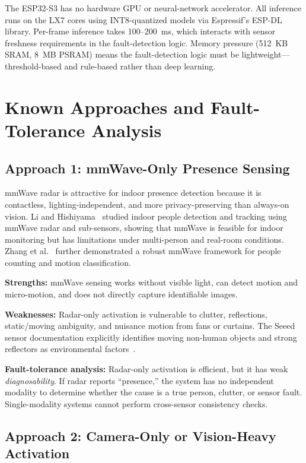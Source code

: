 \documentclass[12pt]{extarticle}
\begin{document}
The ESP32-S3 has no hardware GPU or neural-network accelerator.
All inference runs on the LX7 cores using INT8-quantized models via Espressif's
ESP-DL library.
Per-frame inference takes 100--200~ms, which interacts with sensor freshness
requirements in the fault-detection logic.
Memory pressure (512~KB SRAM, 8~MB PSRAM) means the fault-detection logic
must be lightweight---threshold-based and rule-based rather than deep learning.

\section{Known Approaches and Fault-Tolerance Analysis}
\label{sec:related}

\subsection{Approach 1: mmWave-Only Presence Sensing}

mmWave radar is attractive for indoor presence detection because it is contactless,
lighting-independent, and more privacy-preserving than always-on vision.
Li and Hishiyama~\cite{li2023mmwave} studied indoor people detection and tracking
using mmWave radar and sub-sensors, showing that mmWave is feasible for indoor
monitoring but has limitations under multi-person and real-room conditions.
Zhang et al.~\cite{zhang2026robust} further demonstrated a robust mmWave framework for
people counting and motion classification.

\textbf{Strengths:}
mmWave sensing works without visible light, can detect motion and micro-motion, and
does not directly capture identifiable images.

\textbf{Weaknesses:}
Radar-only activation is vulnerable to clutter, reflections, static/moving ambiguity,
and nuisance motion from fans or curtains.
The Seeed sensor documentation explicitly identifies moving non-human objects and
strong reflectors as environmental factors~\cite{seeed_mmwave}.

\textbf{Fault-tolerance analysis:}
Radar-only activation is efficient, but it has weak \emph{diagnosability}.
If radar reports ``presence,'' the system has no independent modality to determine
whether the cause is a true person, clutter, or sensor fault.
Single-modality systems cannot perform cross-sensor consistency checks.

\subsection{Approach 2: Camera-Only or Vision-Heavy Activation}
\end{document}
